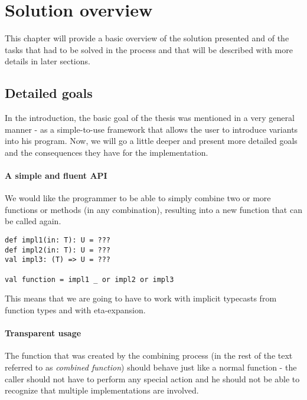 \chapter{Solution overview}

This chapter will provide a basic overview of the solution presented and of the tasks that had to be solved in the process and that will be described with more details in later sections.


\section{Detailed goals}
\label{sec:goals_revisited}

In the introduction, the basic goal of the thesis was mentioned in a very general manner - as a simple-to-use framework that allows the user to introduce variants into his program. Now, we will go a little deeper and present more detailed goals and the consequences they have for the implementation.

\subsubsection{A simple and fluent API}

We would like the programmer to be able to simply combine two or more functions or methods (in any combination), resulting into a new function that can be called again.

\lstset{style=Scala}
\begin{lstlisting}
def impl1(in: T): U = ???
def impl2(in: T): U = ???
val impl3: (T) => U = ???

val function = impl1 _ or impl2 or impl3
\end{lstlisting}

This means that we are going to have to work with implicit typecasts from function types and with eta-expansion.

\subsubsection{Transparent usage}

The function that was created by the combining process (in the rest of the text referred to as \textit{combined function}) should behave just like a normal function - the caller should not have to perform any special action and he should not be able to recognize that multiple implementations are involved.

